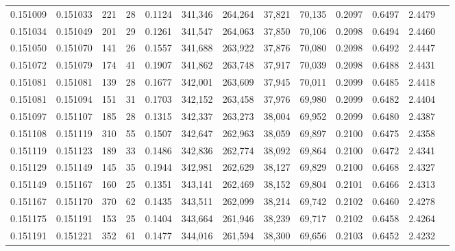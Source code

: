 \begin{tabular}{rrrrrrrrrrrrr}
0.151009 & 0.151033 &   221 &  28 &                                     0.1124 & 341,346 & 264,264 &  37,821 &  70,135 & 0.2097 & 0.6497 & 2.4479 \\
0.151034 & 0.151049 &   201 &  29 &                                     0.1261 & 341,547 & 264,063 &  37,850 &  70,106 & 0.2098 & 0.6494 & 2.4460 \\
0.151050 & 0.151070 &   141 &  26 &                                     0.1557 & 341,688 & 263,922 &  37,876 &  70,080 & 0.2098 & 0.6492 & 2.4447 \\
0.151072 & 0.151079 &   174 &  41 &                                     0.1907 & 341,862 & 263,748 &  37,917 &  70,039 & 0.2098 & 0.6488 & 2.4431 \\
0.151081 & 0.151081 &   139 &  28 &                                     0.1677 & 342,001 & 263,609 &  37,945 &  70,011 & 0.2099 & 0.6485 & 2.4418 \\
0.151081 & 0.151094 &   151 &  31 &                                     0.1703 & 342,152 & 263,458 &  37,976 &  69,980 & 0.2099 & 0.6482 & 2.4404 \\
0.151097 & 0.151107 &   185 &  28 &                                     0.1315 & 342,337 & 263,273 &  38,004 &  69,952 & 0.2099 & 0.6480 & 2.4387 \\
0.151108 & 0.151119 &   310 &  55 &                                     0.1507 & 342,647 & 262,963 &  38,059 &  69,897 & 0.2100 & 0.6475 & 2.4358 \\
0.151119 & 0.151123 &   189 &  33 &                                     0.1486 & 342,836 & 262,774 &  38,092 &  69,864 & 0.2100 & 0.6472 & 2.4341 \\
0.151129 & 0.151149 &   145 &  35 &                                     0.1944 & 342,981 & 262,629 &  38,127 &  69,829 & 0.2100 & 0.6468 & 2.4327 \\
0.151149 & 0.151167 &   160 &  25 &                                     0.1351 & 343,141 & 262,469 &  38,152 &  69,804 & 0.2101 & 0.6466 & 2.4313 \\
0.151167 & 0.151170 &   370 &  62 &                                     0.1435 & 343,511 & 262,099 &  38,214 &  69,742 & 0.2102 & 0.6460 & 2.4278 \\
0.151175 & 0.151191 &   153 &  25 &                                     0.1404 & 343,664 & 261,946 &  38,239 &  69,717 & 0.2102 & 0.6458 & 2.4264 \\
0.151191 & 0.151221 &   352 &  61 &                                     0.1477 & 344,016 & 261,594 &  38,300 &  69,656 & 0.2103 & 0.6452 & 2.4232 \\

\end{tabular}
